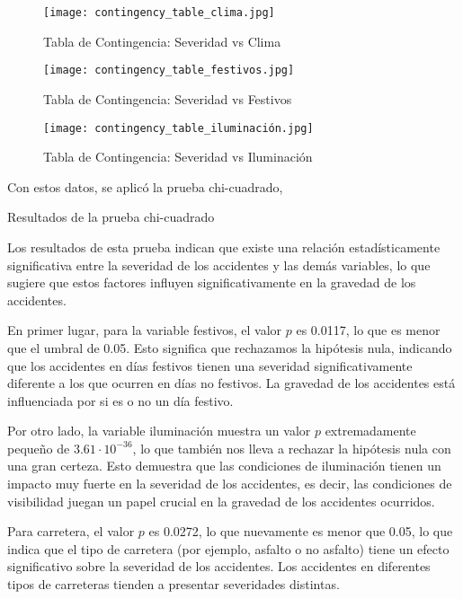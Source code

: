 \documentclass{book}
\begin{document}
\begin{figure}[htbp]
\centering
\texttt{[image: contingency\_table\_clima.jpg]}
\caption{\label{fig:cclima}Tabla de Contingencia: Severidad vs Clima}
\end{figure}
\begin{figure}[htbp]
\centering
\texttt{[image: contingency\_table\_festivos.jpg]}
\caption{\label{fig:cfestivos}Tabla de Contingencia: Severidad vs Festivos}
\end{figure}
\begin{figure}[htbp]
\centering
\texttt{[image: contingency\_table\_iluminación.jpg]}
\caption{\label{fig:ciluminación}Tabla de Contingencia: Severidad vs Iluminación}
\end{figure}

Con estos datos, se aplicó la prueba chi-cuadrado,
\begin{table}[H]
\centering

\caption{Resultados de la prueba chi-cuadrado}
\end{table}

Los resultados de esta prueba indican que existe una relación estadísticamente significativa entre la severidad de los accidentes y las demás variables, lo que sugiere que estos factores influyen significativamente en la gravedad de los accidentes.

En primer lugar, para la variable festivos, el valor \( p \) es 0.0117, lo que es menor que el umbral de 0.05. Esto significa que rechazamos la hipótesis nula, indicando que los accidentes en días festivos tienen una severidad significativamente diferente a los que ocurren en días no festivos. La gravedad de los accidentes está influenciada por si es o no un día festivo.

Por otro lado, la variable iluminación muestra un valor \( p \) extremadamente pequeño de \( 3.61 \cdot 10^{-36} \), lo que también nos lleva a rechazar la hipótesis nula con una gran certeza. Esto demuestra que las condiciones de iluminación tienen un impacto muy fuerte en la severidad de los accidentes, es decir, las condiciones de visibilidad juegan un papel crucial en la gravedad de los accidentes ocurridos.

Para carretera, el valor \( p \) es 0.0272, lo que nuevamente es menor que 0.05, lo que indica que el tipo de carretera (por ejemplo, asfalto o no asfalto) tiene un efecto significativo sobre la severidad de los accidentes. Los accidentes en diferentes tipos de carreteras tienden a presentar severidades distintas.
\end{document}
